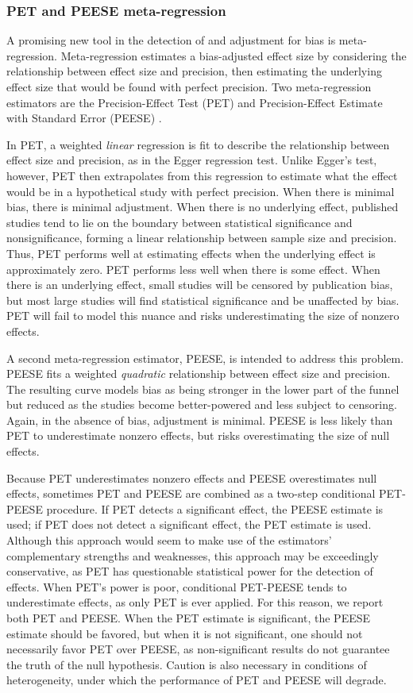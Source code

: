 \documentclass[man, mask]{apa6}
\begin{document}
\subsubsection{PET and PEESE meta-regression}
A promising new tool in the detection of and adjustment for bias is meta-regression. Meta-regression estimates a bias-adjusted effect size by considering the relationship between effect size and precision, then estimating the underlying effect size that would be found with perfect precision. Two meta-regression estimators are the Precision-Effect Test (PET) and Precision-Effect Estimate with Standard Error (PEESE) \citep{Stanley:Doucouliagos:2014}. 

In PET, a weighted {\em linear} regression is fit to describe the relationship between effect size and precision, as in the Egger regression test. Unlike Egger's test, however, PET then extrapolates from this regression to estimate what the effect would be in a hypothetical study with perfect precision. When there is minimal bias, there is minimal adjustment. When there is no underlying effect, published studies tend to lie on the boundary between statistical significance and nonsignificance, forming a linear relationship between sample size and precision. Thus, PET performs well at estimating effects when the underlying effect is approximately zero. PET performs less well when there is some effect. When there is an underlying effect, small studies will be censored by publication bias, but most large studies will find statistical significance and be unaffected by bias. PET will fail to model this nuance and risks underestimating the size of nonzero effects.

A second meta-regression estimator, PEESE, is intended to address this problem. PEESE fits a weighted {\em quadratic} relationship between effect size and precision. The resulting curve models bias as being stronger in the lower part of the funnel but reduced as the studies become better-powered and less subject to censoring. Again, in the absence of bias, adjustment is minimal. PEESE is less likely than PET to underestimate nonzero effects, but risks overestimating the size of null effects.

Because PET underestimates nonzero effects and PEESE overestimates null effects, sometimes PET and PEESE are combined as a two-step conditional PET-PEESE procedure. If PET detects a significant effect, the PEESE estimate is used; if PET does not detect a significant effect, the PET estimate is used. Although this approach would seem to make use of the estimators' complementary strengths and weaknesses, this approach may be exceedingly conservative, as PET has questionable statistical power for the detection of effects. When PET's power is poor, conditional PET-PEESE tends to underestimate effects, as only PET is ever applied. For this reason, we report both PET and PEESE. When the PET estimate is significant, the PEESE estimate should be favored, but when it is not significant, one should not necessarily favor PET over PEESE, as non-significant results do not guarantee the truth of the null hypothesis. Caution is also necessary in conditions of heterogeneity, under which the performance of PET and PEESE will degrade.
\end{document}
